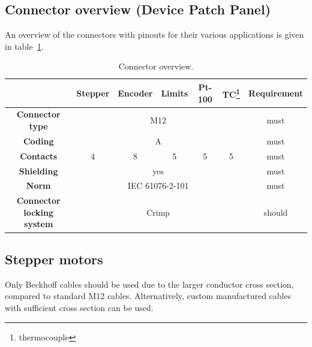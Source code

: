 \documentclass[english]{psi_easy}
\begin{document}
\subsection{Connector overview (Device Patch Panel)}

An overview of the connectors with pinouts for their various applications is given in table~\ref{tab:connectorOverview}.

\begin{table}[!htb]
\caption{\label{tab:connectorOverview}Connector overview.}
\begin{minipage}{\linewidth}
\centering
\begin{tabular}{|c|c|c|c|c|c|c|}
\hline
\textbf{}                         & \textbf{Stepper} & \textbf{Encoder} & \textbf{Limits} & \textbf{Pt-100} & \textbf{TC}\footnote{thermocouple} & \textbf{Requirement} \\ \hline
\textbf{Connector type}           & \multicolumn{5}{c|}{M12}                                                              & must                 \\ \hline
\textbf{Coding}                   & \multicolumn{5}{c|}{A}                                                                & must                 \\ \hline
\textbf{Contacts}                 & 4                & 8                & 5               & 5               & 5           & must                 \\ \hline
\textbf{Shielding}                & \multicolumn{5}{c|}{yes}                                                              & must                 \\ \hline
\textbf{Norm}                     & \multicolumn{5}{c|}{IEC 61076-2-101}                                                   & must                 \\ \hline
\textbf{Connector locking system} & \multicolumn{5}{c|}{Crimp}                                                            & should               \\ \hline
\end{tabular}
\end{minipage}
\end{table}

\subsection{Stepper motors}
Only Beckhoff cables should be used due to the larger conductor cross section, compared to standard M12 cables.
Alternatively, custom manufactured cables with sufficient cross section can be used.
\end{document}
